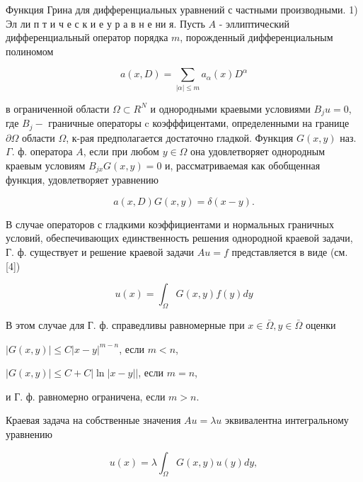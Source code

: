 \documentclass[10pt]{article}
\begin{document}
Функция Грина для дифференциальных уравнений с частными производными. 1) Эл ли п т и ч е с к и е у р а в н е ни я. Пусть $A$ - эллиптический дифференциальный оператор порядка $m$, порожденный дифференциальным полиномом



\[

a(x, D)=\sum_{|\alpha| \leqslant m} a_{\alpha}(x) D^{\alpha}

\]



в ограниченной области $\Omega \subset R^{N}$ и однородными краевыми условиями $B_{j} u=0$, где $B_{j}-$ граничные операторы c коэфффицентами, определенными на границе $\partial \Omega$ области $\Omega$, к-рая предполагается достаточно гладкой. Функция $G(x, y)$ наз. $\Gamma$. ф. оператора $A$, если при любом $y \in \Omega$ она удовлетворяет однородным краевым условиям $B_{j x} G(x, y)=0$ и, рассматриваемая как обобщенная функция, удовлетворяет уравнению



\[

a(x, D) G(x, y)=\delta(x-y) .

\]



В случае операторов с гладкими коэффициентами и нормальных граничных условий, обеспечивающих единственность решения однородной краевой задачи, Г. ф. существует и решение краевой задачи $A u=f$ представляется в виде (см. [4])



\[

u(x)=\int_{\Omega} G(x, y) f(y) d y

\]



В этом случае для Г. ф. справедливы равномерные при $x \in \bar{\Omega}, y \in \bar{\Omega}$ оценки



$|G(x, y)| \leqslant C|x-y|^{m-n}$, если $m<n$,



$|G(x, y)| \leqslant C+C|\ln | x-y||$, если $m=n$,



и Г. ф. равномерно ограничена, если $m>n$.



Краевая задача на собственные значения $A u=\lambda u$ эквивалентна интегральному уравнению



\[

u(x)=\lambda \int_{\Omega} G(x, y) u(y) d y,

\]
\end{document}
